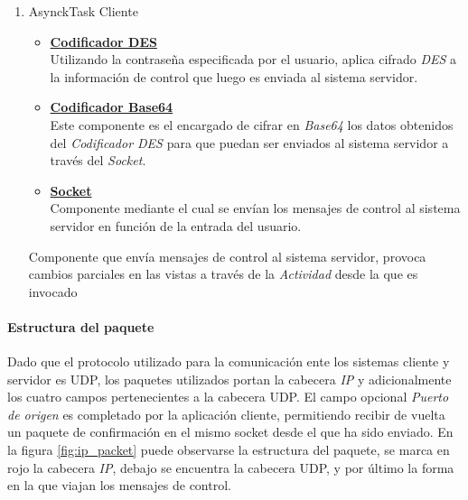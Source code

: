 \documentclass[12pt]{article}
\begin{document}
\begin{enumerate}
\begin{itemize}
                    \end{itemize}
                \item AsynckTask Cliente
                    \begin{itemize}
                        \item \textbf{\underline{Codificador DES}} \\
                            Utilizando la contraseña especificada por el usuario, aplica cifrado \textit{DES} a la información de control que luego es enviada al sistema servidor.
                        \item \textbf{\underline{Codificador Base64}} \\
                            Este componente es el encargado de cifrar en \textit{Base64} los datos obtenidos del \textit{Codificador DES} para que puedan ser enviados al sistema servidor a través del \textit{Socket}.
                        \item \textbf{\underline{Socket}} \\ 
                            Componente mediante el cual se envían los mensajes de control al sistema servidor en función de la entrada del usuario.
                    \end{itemize}
                    Componente que envía mensajes de control al sistema servidor, provoca cambios parciales en las vistas a través de la \textit{Actividad} desde la que es invocado
            \end{enumerate}

            \paragraph{ Estructura del paquete}
            Dado que el protocolo utilizado para la comunicación ente los sistemas cliente y servidor es UDP, los paquetes utilizados portan la cabecera \textit{IP} y adicionalmente los cuatro campos pertenecientes a la cabecera UDP. El campo opcional \textit{Puerto de origen} es completado por la aplicación cliente, permitiendo recibir de vuelta un paquete de confirmación en el mismo socket desde el que ha sido enviado. En la figura \ref{fig:ip_packet} puede observarse la estructura del paquete, se marca en rojo la cabecera \textit{IP}, debajo se encuentra la cabecera UDP, y por último la forma en la que viajan los mensajes de control.
\end{document}
